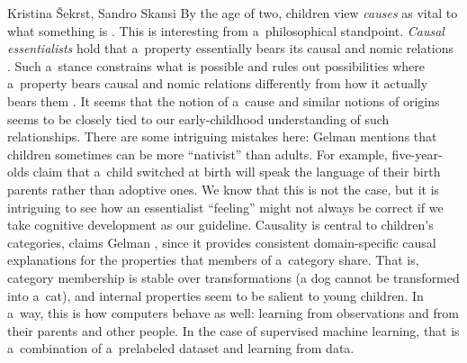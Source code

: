 \begin{artengenv2auth}{Kristina Šekrst, Sandro Skansi}
By the age of two, children view \textit{causes} as vital to what something is
\parencite[][p.406]{gelman_psychological_2004}. %
 This is interesting from a~philosophical standpoint. \textit{Causal essentialists} hold that a~property essentially bears its causal and nomic relations 
\parencite[][p.2332]{gibbs_causal_2018}. %
 Such a~stance constrains what is possible and rules out possibilities where a~property bears causal and nomic relations differently from how it actually bears them 
\parencite[][p.2334]{gibbs_causal_2018}. %
 It seems that the notion of a~cause and similar notions of origins seems to be closely tied to our early-childhood understanding of such relationships. There are some intriguing mistakes here: Gelman 
\parencite*[][p.406]{gelman_psychological_2004} %
 mentions that children sometimes can be more ``nativist'' than adults. For example, five-year-olds claim that a~child switched at birth will speak the language of their birth parents rather than adoptive ones. We know that this is not the case, but it is intriguing to see how an essentialist ``feeling'' might not always be correct if we take cognitive development as our guideline. Causality is central to children's categories, claims Gelman 
\parencite*[][p.406]{gelman_psychological_2004}, %
 since it provides consistent domain-specific causal explanations for the properties that members of a~category share. That is, category membership is stable over transformations (a dog cannot be transformed into a~cat), and internal properties seem to be salient to young children. In a~way, this is how computers behave as well: learning from observations and from their parents and other people. In the case of supervised machine learning, that is a~combination of a~prelabeled dataset and learning from data.


\end{artengenv2auth}

